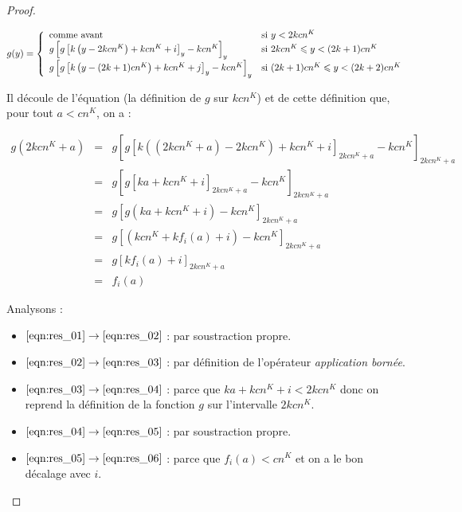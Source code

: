 \begin{appendices}
\begin{proof}
\begin{enumerate}[itemsep=-1mm,leftmargin=2cm]
				\[
				g(y) = \left\lbrace \begin{array}{ll} 
					\text{comme avant} & \text{si $y < 2kcn^K$} \\
					g\left[ g\left[ k\left( y - 2kcn^K \right) + kcn^K  + i\right]_y - kcn^K  \right]_y & \text{si $2kcn^K \leqslant y < (2k+1)cn^K$} \\
					g\left[ g\left[ k\left( y - (2k + 1)cn^K \right) + kcn^K  + j \right]_y - kcn^K  \right]_y & \text{si $(2k+1)cn^K \leqslant y < (2k+2)cn^K$} \\
				 \end{array} \right.
				\]
				
				Il découle de l'équation \redtext{$(\star)$} (la définition de $g$ sur $kcn^K$) et de cette définition que, pour tout $a < cn^K$, on a :
				
		 
				\begin{eqnarray}
					g\left( 2kcn^K + a\right)	& = & 		g\left[ g\left[ k\left( \left(2kcn^K + a\right) - 2kcn^K \right) + kcn^K  + i\right]_{2kcn^K + a} - kcn^K  \right]_{2kcn^K + a} \label{eqn:res_01} \\
												& = & 		g\left[ g\left[ k a + kcn^K  + i\right]_{2kcn^K + a} - kcn^K  \right]_{2kcn^K + a} \label{eqn:res_02}\\
												& = & 		g\left[ g\left( k a + kcn^K  + i\right) - kcn^K  \right]_{2kcn^K + a} \label{eqn:res_03}\\
												& = & 		g\left[ \left(kcn^K  +  k f_i(a) + i\right) - kcn^K  \right]_{2kcn^K + a} \label{eqn:res_04}\\
												& = & 		g\left[ k f_i(a) + i \right]_{2kcn^K + a} \label{eqn:res_05}\\
												& = & 		f_i(a) \label{eqn:res_06}
				\end{eqnarray}
					
				Analysons :
					\begin{itemize}
						\setlength{\itemsep}{-1mm}
						\item	$\ref{eqn:res_01} \rightarrow \ref{eqn:res_02}$ : par soustraction propre.
						\item 	$\ref{eqn:res_02} \rightarrow \ref{eqn:res_03}$ : par définition de l'opérateur \emph{application bornée}.
						\item 	$\ref{eqn:res_03} \rightarrow \ref{eqn:res_04}$ : parce que $k a + kcn^K  + i < 2kcn^K$ donc on reprend la définition de la fonction $g$ sur l'intervalle $2kcn^K$.
						\item 	$\ref{eqn:res_04} \rightarrow \ref{eqn:res_05}$ : par soustraction propre.
						\item 	$\ref{eqn:res_05} \rightarrow \ref{eqn:res_06}$ : parce que $f_i(a) < cn^K$ et on a le bon décalage avec $i$.
					\end{itemize}	
					

\end{enumerate}
\end{proof}
\end{appendices}
